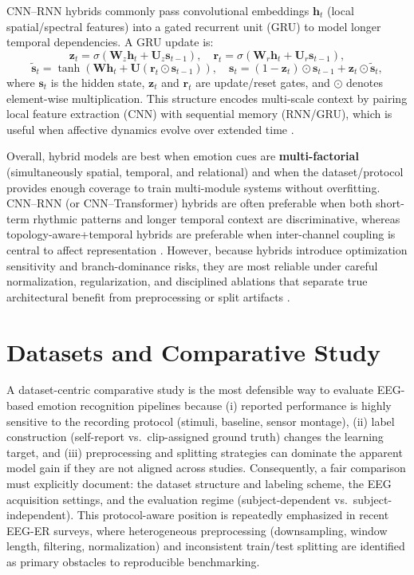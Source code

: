 \documentclass{WileyMSP-template}
\begin{document}
CNN--RNN hybrids commonly pass convolutional embeddings $\mathbf{h}_t$ (local spatial/spectral features) into a gated recurrent unit (GRU) to model longer temporal dependencies. A GRU update is:
\begin{equation}
\mathbf{z}_t=\sigma(\mathbf{W}_z\mathbf{h}_t+\mathbf{U}_z\mathbf{s}_{t-1}),\quad
\mathbf{r}_t=\sigma(\mathbf{W}_r\mathbf{h}_t+\mathbf{U}_r\mathbf{s}_{t-1}),
\end{equation}
\begin{equation}
\tilde{\mathbf{s}}_t=\tanh(\mathbf{W}\mathbf{h}_t+\mathbf{U}(\mathbf{r}_t\odot \mathbf{s}_{t-1})),\quad
\mathbf{s}_t=(1-\mathbf{z}_t)\odot \mathbf{s}_{t-1}+\mathbf{z}_t\odot \tilde{\mathbf{s}}_t,
\end{equation}
where $\mathbf{s}_t$ is the hidden state, $\mathbf{z}_t$ and $\mathbf{r}_t$ are update/reset gates, and $\odot$ denotes element-wise multiplication. This structure encodes multi-scale context by pairing local feature extraction (CNN) with sequential memory (RNN/GRU), which is useful when affective dynamics evolve over extended time \cite{tzhang2019spatialt,hheand2019channela}.

Overall, hybrid models are best when emotion cues are \textbf{multi-factorial} (simultaneously spatial, temporal, and relational) and when the dataset/protocol provides enough coverage to train multi-module systems without overfitting. CNN--RNN (or CNN--Transformer) hybrids are often preferable when both short-term rhythmic patterns and longer temporal context are discriminative, whereas topology-aware+temporal hybrids are preferable when inter-channel coupling is central to affect representation \cite{tzhang2019spatialt,hheand2019channela}. However, because hybrids introduce optimization sensitivity and branch-dominance risks, they are most reliable under careful normalization, regularization, and disciplined ablations that separate true architectural benefit from preprocessing or split artifacts \cite{megger2019emotionr,nssuha2020eegbased,wlizzh2021physiolo}.

\section{Datasets and Comparative Study}

A dataset-centric comparative study is the most defensible way to evaluate EEG-based emotion recognition pipelines because (i) reported performance is highly sensitive to the recording protocol (stimuli, baseline, sensor montage), (ii) label construction (self-report vs.\ clip-assigned ground truth) changes the learning target, and (iii) preprocessing and splitting strategies can dominate the apparent model gain if they are not aligned across studies. Consequently, a fair comparison must explicitly document: the dataset structure and labeling scheme, the EEG acquisition settings, and the evaluation regime (subject-dependent vs.\ subject-independent). This protocol-aware position is repeatedly emphasized in recent EEG-ER surveys, where heterogeneous preprocessing (downsampling, window length, filtering, normalization) and inconsistent train/test splitting are identified as primary obstacles to reproducible benchmarking. \cite{kukhilava2025evaluation,li2022tutorial}
\end{document}
